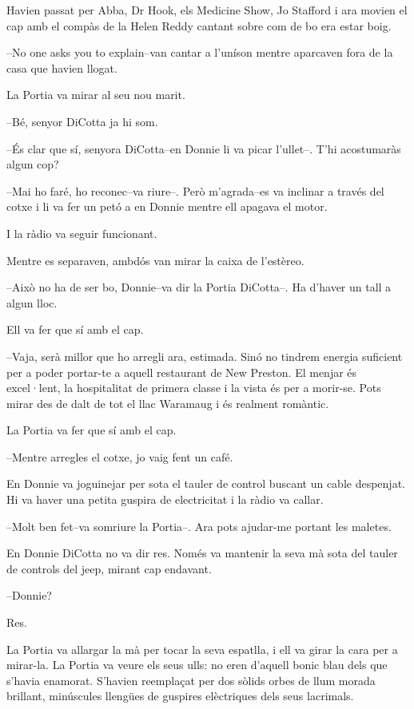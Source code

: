 Havien passat per Abba, Dr Hook, els Medicine Show, Jo Stafford i ara
movien el cap amb el compàs de la Helen Reddy cantant sobre com de bo
era estar boig.

--No one asks you to explain--van cantar a l'uníson mentre aparcaven
fora de la casa que havien llogat.

La Portia va mirar al seu nou marit.

--Bé, senyor DiCotta ja hi som.

--És clar que sí, senyora DiCotta--en Donnie li va picar l'ullet--. T'hi
acostumaràs algun cop?

--Mai ho faré, ho reconec--va riure--. Però m'agrada--es va inclinar a
través del cotxe i li va fer un petó a en Donnie mentre ell apagava el
motor.

I la ràdio va seguir funcionant.

Mentre es separaven, ambdós van mirar la caixa de l'estèreo.

--Això no ha de ser bo, Donnie--va dir la Portia DiCotta--. Ha d'haver
un tall a algun lloc.

Ell va fer que sí amb el cap.

--Vaja, serà millor que ho arregli ara, estimada. Sinó no tindrem
energia suficient per a poder portar-te a aquell restaurant de New
Preston. El menjar és excel·lent, la hospitalitat de primera classe i la
vista és per a morir-se. Pots mirar des de dalt de tot el llac Waramaug
i és realment romàntic.

La Portia va fer que sí amb el cap.

--Mentre arregles el cotxe, jo vaig fent un café.

En Donnie va joguinejar per sota el tauler de control buscant un cable
despenjat. Hi va haver una petita guspira de electricitat i la ràdio va
callar.

--Molt ben fet--va somriure la Portia--. Ara pots ajudar-me portant les
maletes.

En Donnie DiCotta no va dir res. Només va mantenir la seva mà sota del
tauler de controls del jeep, mirant cap endavant.

--Donnie?

Res.

La Portia va allargar la mà per tocar la seva espatlla, i ell va girar
la cara per a mirar-la. La Portia va veure els seus ulls: no eren
d'aquell bonic blau dels que s'havia enamorat. S'havien reemplaçat per
dos sòlids orbes de llum morada brillant, minúscules llengües de
guspires elèctriques dels seus lacrimals.

